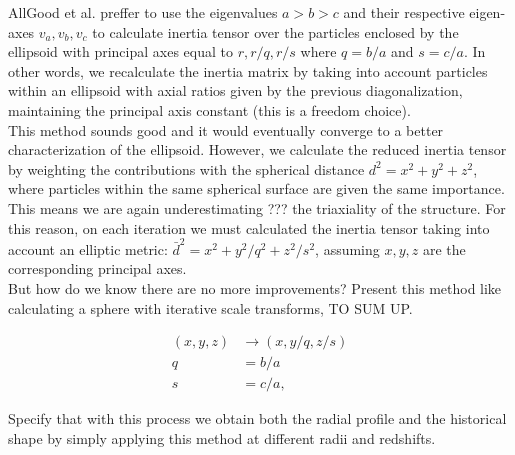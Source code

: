 AllGood et al. preffer to use the eigenvalues $a>b>c$ and their respective eigen-axes $v_a,v_b,v_c$ to calculate  inertia tensor over the particles enclosed by the ellipsoid with principal axes equal to $r,r/q,r/s$ where $q = b/a$ and $s=c/a$. In other words, we recalculate the inertia matrix by taking into account particles within an ellipsoid with axial ratios given by the previous diagonalization, maintaining the principal axis constant (this is a freedom choice).\\

This method sounds good and it would eventually converge to a better characterization of the ellipsoid. However, we calculate the reduced inertia tensor by weighting the contributions with the spherical distance $d^2=x^2+y^2+z^2$, where particles within the same spherical surface are given the same importance. This means we are again underestimating ??? the triaxiality of the structure. For this reason, on each iteration we must calculated the inertia tensor taking into account an elliptic metric: $\bar{d}^2 = x^2+y^2/q^2+z^2/s^2$, assuming $x,y,z$ are the corresponding principal axes.\\

But how do we know there are no more improvements? Present this method like calculating a sphere with iterative scale transforms, TO SUM UP. 
  


\begin{align}
(x,y,z) &\rightarrow (x,y/q,z/s) \label{eq:scale}\\
q &=  b/a \nonumber \\
s &= c/a \nonumber ,
\end{align}

Specify that with this process we obtain both the radial profile and the historical shape by simply applying this method at different radii and redshifts.
